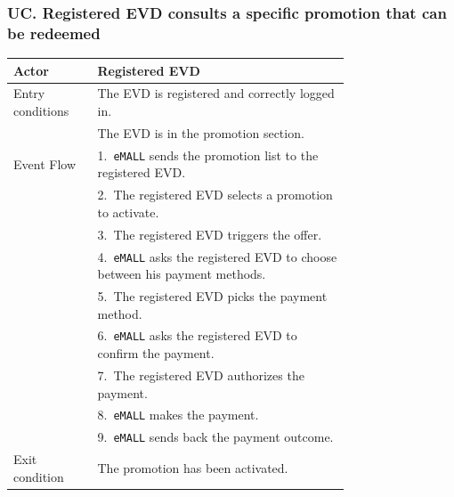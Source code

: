 \subsubsection*{UC\cuc . Registered EVD consults a specific promotion that can be redeemed}
\begin{center}
    \begin{longtable}{lp{0.75\linewidth}}
        \hline
        Actor            & Registered EVD                                                                                                        \\
        \hline
        Entry conditions & The EVD is registered and correctly logged in.                                                                        \\
        & The EVD is in the promotion section.                                                                                  \\
        \hline
        Event Flow       & 1.\ \verb|eMALL| sends the promotion list to the registered EVD.                                                      \\
        & 2.\ The registered EVD selects a promotion to activate.                                                               \\
        & 3.\ The registered EVD triggers the offer.                                                                            \\
        & 4.\ \verb|eMALL| asks the registered EVD to choose between his payment methods.                                       \\
        & 5.\ The registered EVD picks the payment method.                                                                      \\
        & 6.\ \verb|eMALL| asks the registered EVD to confirm the payment.                                                      \\
        & 7.\ The registered EVD authorizes the payment.                                                                        \\
        & 8.\ \verb|eMALL| makes the payment.                                                                                   \\
        & 9.\ \verb|eMALL| sends back the payment outcome.                                                                      \\
        \hline
        Exit condition   & The promotion has been activated.                                                                                     \\

\end{longtable}
\end{center}

